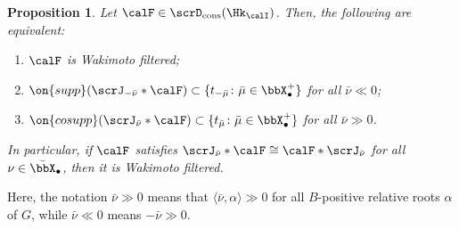 \documentclass[10pt, reqno]{amsart}
\theoremstyle{plain}
\newtheorem{proposition}[theorem]{Proposition}
\theoremstyle{definition}
\numberwithin{equation}{section}
\begin{document}
	\begin{proposition}\label{prop_wak_category_central}
		Let $\calF\in \scrD_{\mathrm{cons}}(\Hk_\calI)$. Then, the following are equivalent:
		\begin{enumerate}
			\item $\calF$ is Wakimoto filtered;
			\item $\on{supp}(\scrJ_{-\bar \nu} \ast \calF) \subset \{ t_{-\bar \mu} \colon \bar\mu\in\bbX_\bullet^+\}$ for all $\bar \nu \ll 0$;
			\item $\on{cosupp}(\scrJ_{\bar \nu} \ast \calF) \subset \{ t_{\bar \mu} \colon \bar\mu\in\bbX_\bullet^+\}$ for all $\bar\nu \gg 0$.
		\end{enumerate}
		In particular, if $\calF$ satisfies $\scrJ_{\bar\nu}\ast \calF\cong \calF\ast \scrJ_{\bar\nu}$ for all $\nu\in \bar\bbX_\bullet$, then it is Wakimoto filtered.
	\end{proposition}
	Here, the notation $\bar{\nu}\gg 0$ means that $\langle \bar \nu, \alpha \rangle \gg 0$ for all $B$-positive relative roots $\alpha$ of $G$, while $\bar\nu\ll 0$ means $-\bar\nu\gg 0$.
\end{document}
